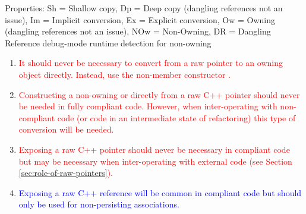 {\begin{minipage}{\textwidth}
Properties: Sh = Shallow copy, Dp = Deep copy (dangling references not
an issue), Im = Implicit conversion, Ex = Explicit conversion, Ow =
Owning (dangling references not an issue), NOw = Non-Owning, DR =
Dangling Reference debug-mode runtime detection for non-owning

\begin{enumerate}
%
{}\item\label{conv:arcp-owning}\textcolor{red}{It should never be
necessary to convert from a raw pointer to an owning {}
object directly.  Instead, use the non-member constructor
{}.}
%
{}\item\label{conv:arcp-nonowning}\textcolor{red}{Constructing a
non-owning {} or {} directly from a raw
C++ pointer should never be needed in fully compliant code.  However,
when inter-operating with non-compliant code (or code in an intermediate
state of refactoring) this type of conversion will be needed.}
%
{}\item\label{conv:array-expose-raw-ptr}\textcolor{red}{Exposing a raw
C++ pointer should never be necessary in compliant code but may be
necessary when inter-operating with external code (see Section
{}\ref{sec:role-of-raw-pointers}).}
%
{}\item\label{conv:array-expose-raw-ref}\textcolor{blue}{Exposing a
raw C++ reference will be common in compliant code but should only be
used for non-persisting associations.}
%
\end{enumerate}

\end{minipage}}
